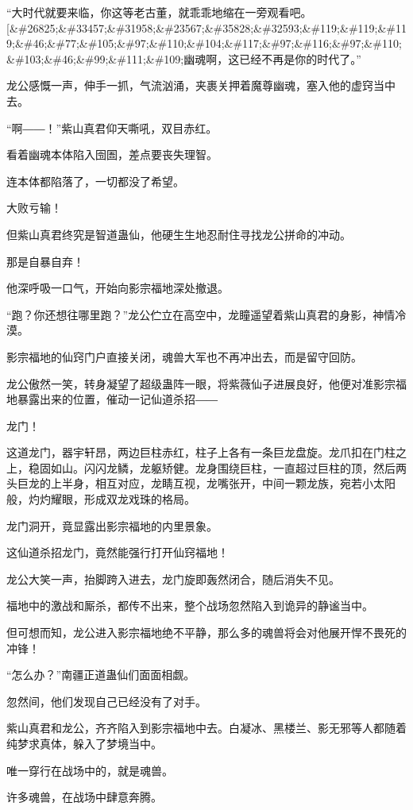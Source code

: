 \begin{this_body}
“大时代就要来临，你这等老古董，就乖乖地缩在一旁观看吧。[\&\#26825;\&\#33457;\&\#31958;\&\#23567;\&\#35828;\&\#32593;\&\#119;\&\#119;\&\#119;\&\#46;\&\#77;\&\#105;\&\#97;\&\#110;\&\#104;\&\#117;\&\#97;\&\#116;\&\#97;\&\#110;\&\#103;\&\#46;\&\#99;\&\#111;\&\#109;幽魂啊，这已经不再是你的时代了。”

龙公感慨一声，伸手一抓，气流汹涌，夹裹关押着魔尊幽魂，塞入他的虚窍当中去。

“啊――！”紫山真君仰天嘶吼，双目赤红。

看着幽魂本体陷入囹圄，差点要丧失理智。

连本体都陷落了，一切都没了希望。

大败亏输！

但紫山真君终究是智道蛊仙，他硬生生地忍耐住寻找龙公拼命的冲动。

那是自暴自弃！

他深呼吸一口气，开始向影宗福地深处撤退。

“跑？你还想往哪里跑？”龙公伫立在高空中，龙瞳遥望着紫山真君的身影，神情冷漠。

影宗福地的仙窍门户直接关闭，魂兽大军也不再冲出去，而是留守回防。

龙公傲然一笑，转身凝望了超级蛊阵一眼，将紫薇仙子进展良好，他便对准影宗福地暴露出来的位置，催动一记仙道杀招――

龙门！

这道龙门，器宇轩昂，两边巨柱赤红，柱子上各有一条巨龙盘旋。龙爪扣在门柱之上，稳固如山。闪闪龙鳞，龙躯矫健。龙身围绕巨柱，一直超过巨柱的顶，然后两头巨龙的上半身，相互对应，龙睛互视，龙嘴张开，中间一颗龙族，宛若小太阳般，灼灼耀眼，形成双龙戏珠的格局。

龙门洞开，竟显露出影宗福地的内里景象。

这仙道杀招龙门，竟然能强行打开仙窍福地！

龙公大笑一声，抬脚跨入进去，龙门旋即轰然闭合，随后消失不见。

福地中的激战和厮杀，都传不出来，整个战场忽然陷入到诡异的静谧当中。

但可想而知，龙公进入影宗福地绝不平静，那么多的魂兽将会对他展开悍不畏死的冲锋！

“怎么办？”南疆正道蛊仙们面面相觑。

忽然间，他们发现自己已经没有了对手。

紫山真君和龙公，齐齐陷入到影宗福地中去。白凝冰、黑楼兰、影无邪等人都随着纯梦求真体，躲入了梦境当中。

唯一穿行在战场中的，就是魂兽。

许多魂兽，在战场中肆意奔腾。


\end{this_body}
